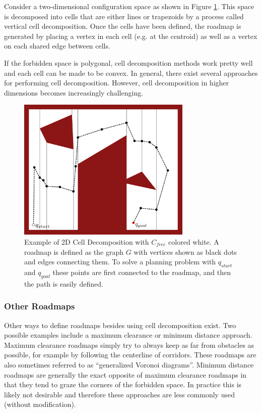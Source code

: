 \begin{example} \label{ex:celldecomp}
Consider a two-dimensional configuration space as shown in Figure \ref{fig:cell-decompsition}. This space is decomposed into cells that are either lines or trapezoids by a process called vertical cell decomposition. Once the cells have been defined, the roadmap is generated by placing a vertex in each cell (e.g. at the centroid) as well as a vertex on each shared edge between cells.

If the forbidden space is polygonal, cell decomposition methods work pretty well and each cell can be made to be convex. In general, there exist several approaches for performing cell decomposition. However, cell decomposition in higher dimensions becomes increasingly challenging.

\begin{figure}[ht]
\begin{center}
\includegraphics[width=0.74\textwidth]{tex/figs/ch05_figs/2d_cell_decomp.png}
\caption{Example of 2D Cell Decomposition with $C_{free}$ colored white. A roadmap is defined as the graph $G$ with vertices shown as black dots and edges connecting them. To solve a planning problem with $q_{start}$ and $q_{goal}$ these points are first connected to the roadmap, and then the path is easily defined.}
\label{fig:cell-decompsition}
\end{center}
\end{figure}
\end{example}

\subsubsection{Other Roadmaps}
Other ways to define roadmaps besides using cell decomposition exist. Two possible examples include a maximum clearance or minimum distance approach. Maximum clearance roadmaps simply try to always keep as far from obstacles as possible, for example by following the centerline of corridors. These roadmaps are also sometimes referred to as ``generalized Voronoi diagrams''. Minimum distance roadmaps are generally the exact opposite of maximum clearance roadmaps in that they tend to graze the corners of the forbidden space. In practice this is likely not desirable and therefore these approaches are less commonly used (without modification).


